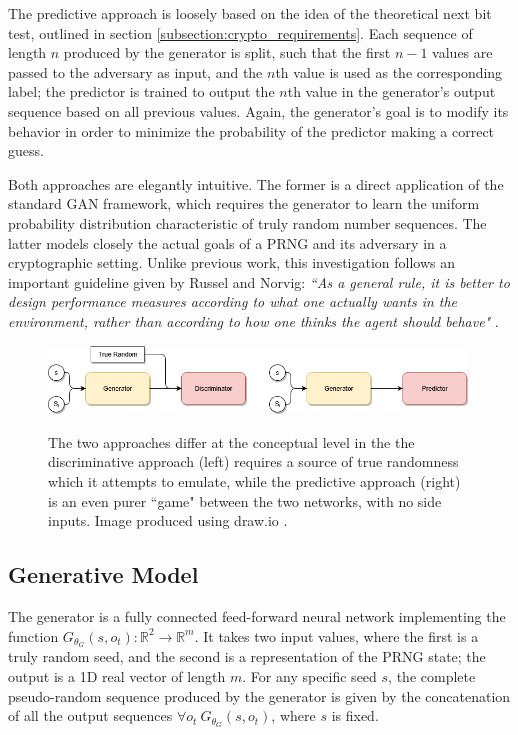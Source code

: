 \documentclass[12pt, titlepage]{report}
\theoremstyle{definition}
\begin{document}
The predictive approach is loosely based on the idea of the theoretical next bit test, outlined in section \ref{subsection:crypto_requirements}. Each sequence of length $n$ produced by the generator is split, such that the first $n - 1$ values are passed to the adversary as input, and the $n$th value is used as the corresponding label; the predictor is trained to output the $n$th value in the generator's output sequence based on all previous values. Again, the generator's goal is to modify its behavior in order to minimize the probability of the predictor making a correct guess.

Both approaches are elegantly intuitive. The former is a direct application of the standard GAN framework, which requires the generator to learn the uniform probability distribution characteristic of truly random number sequences. The latter models closely the actual goals of a PRNG and its adversary in a cryptographic setting. Unlike previous work, this investigation follows an important guideline given by Russel and Norvig: \textit{``As a general rule, it is better to design performance measures according to what one actually wants in the environment, rather than according to how one thinks the agent should behave"} \cite[p. 37]{russel2009artificial}.

\begin{figure}
\centering
\includegraphics[width=0.99\textwidth]{img/approach_comparison.png}\\
\caption{The two approaches differ at the conceptual level in the the discriminative approach (left) requires a source of true randomness which it attempts to emulate, while the predictive approach (right) is an even purer ``game" between the two networks, with no side inputs. Image produced using draw.io \cite{jgraph2018draw}.}
\label{figure:approach_comparison}
\end{figure}



\subsection{Generative Model}
The generator is a fully connected feed-forward neural network implementing the function $G_{\theta_{G}}(s, o_t) : \mathbb{R}^2 \rightarrow \mathbb{R}^m$. It takes two input values, where the first is a truly random seed, and the second is a representation of the PRNG state; the output is a 1D real vector of length $m$. For any specific seed $s$, the complete pseudo-random sequence produced by the generator is given by the concatenation of all the output sequences $\forall o_t\ G_{\theta_{G}}(s, o_t)$, where $s$ is fixed.
\end{document}
